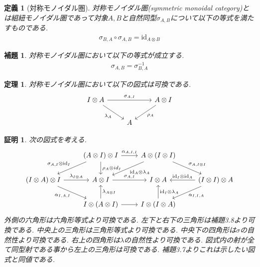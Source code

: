 \documentclass[a4paper,12pt]{ltjsarticle}
\theoremstyle{break}
\newtheorem{defn}[thm]{定義}
\newtheorem{thrm}[thm]{定理}
\newtheorem{lem}[thm]{補題}
\newtheorem*{prf}{証明}
\newcommand{\id}{\mathrm{id}}
\newcommand{\ci}{\circ}
\newcommand{\al}{\alpha}
\newcommand{\la}{\lambda}
\newcommand{\si}{\sigma}
\newcommand{\ot}{\otimes}
\numberwithin{equation}{section}
\begin{document}
\begin{defn}[対称モノイダル圏]
  対称モノイダル圏(symmetric monoidal category)とは組紐モノイダル圏であって対象$A,B$と自然同型$\si_{A,B}$について以下の等式を満たすものである. 
  \begin{align*}
    \si_{B,A} \ci \si_{A,B} = \id_{A \ot B}
  \end{align*}
\end{defn}

\begin{lem}
  対称モノイダル圏において以下の等式が成立する. 
  \begin{align*}
    \si_{A,B}=\si_{B,A}^{-1}
  \end{align*}
\end{lem} 

\begin{thrm}
  対称モノイダル圏において以下の図式は可換である. 
  \[\begin{tikzcd}
    {I \ot A} && {A \ot I} \\
    & A
    \arrow["{\si_{A,I}}", from=1-1, to=1-3]
    \arrow["{\la_A}"', from=1-1, to=2-2]
    \arrow["{\rho_A}", from=1-3, to=2-2]
  \end{tikzcd}\]
\end{thrm}

\begin{prf}
  次の図式を考える. 
  \[\begin{tikzcd}
    & {(A \ot I) \ot I} & {A \ot (I \ot I)} \\
    {(I \ot A) \ot I} & {A \ot I} & {I \ot A} & {(I \ot I) \ot A} \\
    & {I \ot (A \ot I)} & {I \ot (I \ot A)}
    \arrow["{\si_{A,I} \ot \id_I}"', from=1-2, to=2-1]
    \arrow["{\rho_A \ot id_I}", from=1-2, to=2-2]
    \arrow["{\la_{I \ot A}}", from=2-1, to=2-2]
    \arrow["{\al_{I,A,I}}"', from=2-1, to=3-2]
    \arrow["{\la_{A \ot I}}"', from=3-2, to=2-2]
    \arrow["{\al_{A,I,I}}", from=1-2, to=1-3]
    \arrow["{\id_A \ot \la_A}", from=1-3, to=2-2]
    \arrow["{\si_{A,I}}", from=2-2, to=2-3]
    \arrow["{\id_I \ot \id_A}"', from=2-4, to=2-3]
    \arrow["{\al_{I,I,A}}", from=2-4, to=3-3]
    \arrow["{\id_I \ot \la_A}"', from=3-3, to=2-3]
    \arrow[from=3-2, to=3-3]
    \arrow["{\si_{A,I \ot I}}", from=1-3, to=2-4]
  \end{tikzcd}\]
  外側の六角形は六角形等式より可換である. 
  左下と右下の三角形は補題3.8より可換である. 
  中央上の三角形は三角形等式より可換である. 
  中央下の四角形は$\si$の自然性より可換である. 
  右上の四角形は$\la$の自然性より可換である. 
  図式内の射が全て同型射である事から左上の三角形は可換である. 
  補題3.7よりこれは示したい図式と同値である. 
\end{prf}
\end{document}
